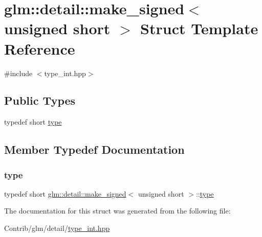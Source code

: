 \hypertarget{structglm_1_1detail_1_1make__signed_3_01unsigned_01short_01_4}{}\section{glm\+:\+:detail\+:\+:make\+\_\+signed$<$ unsigned short $>$ Struct Template Reference}
\label{structglm_1_1detail_1_1make__signed_3_01unsigned_01short_01_4}


{\ttfamily \#include $<$type\+\_\+int.\+hpp$>$}

\subsection*{Public Types}
\begin{DoxyCompactItemize}
\item 
typedef short \mbox{\hyperlink{structglm_1_1detail_1_1make__signed_3_01unsigned_01short_01_4_af5793ac48501a8fb2be1d5aa55afff67}{type}}
\end{DoxyCompactItemize}


\subsection{Member Typedef Documentation}
\mbox{\label{structglm_1_1detail_1_1make__signed_3_01unsigned_01short_01_4_af5793ac48501a8fb2be1d5aa55afff67}} 
\subsubsection{\texorpdfstring{type}{type}}
{\footnotesize\ttfamily typedef short \mbox{\hyperlink{structglm_1_1detail_1_1make__signed}{glm\+::detail\+::make\+\_\+signed}}$<$ unsigned short $>$\+::\mbox{\hyperlink{structglm_1_1detail_1_1make__signed_3_01unsigned_01short_01_4_af5793ac48501a8fb2be1d5aa55afff67}{type}}}



The documentation for this struct was generated from the following file\+:\begin{DoxyCompactItemize}
\item 
Contrib/glm/detail/\mbox{\hyperlink{type__int_8hpp}{type\+\_\+int.\+hpp}}\end{DoxyCompactItemize}
